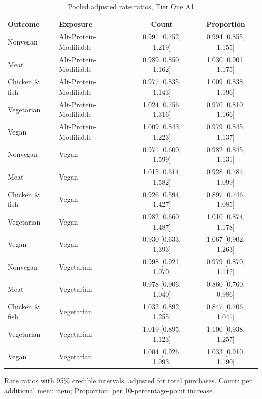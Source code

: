 

\begin{table}[H]
\centering
\caption{Pooled adjusted rate ratios, Tier One A1}
\label{tab:rr_t1_a1}
\begin{tabular}{llcc}
\toprule
Outcome & Exposure & Count & Proportion \\
\midrule
Nonvegan & Alt-Protein-Modifiable & 0.991 [0.752, 1.219] & 0.994 [0.855, 1.155] \\
Meat & Alt-Protein-Modifiable & 0.989 [0.850, 1.162] & 1.030 [0.901, 1.175] \\
Chicken \& fish & Alt-Protein-Modifiable & 0.977 [0.835, 1.143] & 1.009 [0.838, 1.196] \\
Vegetarian & Alt-Protein-Modifiable & 1.024 [0.756, 1.316] & 0.970 [0.810, 1.166] \\
Vegan & Alt-Protein-Modifiable & 1.009 [0.843, 1.223] & 0.979 [0.845, 1.137] \\
Nonvegan & Vegan & 0.971 [0.600, 1.599] & 0.982 [0.845, 1.131] \\
Meat & Vegan & 1.015 [0.614, 1.582] & 0.928 [0.787, 1.099] \\
Chicken \& fish & Vegan & 0.926 [0.594, 1.427] & 0.897 [0.746, 1.085] \\
Vegetarian & Vegan & 0.982 [0.660, 1.487] & 1.010 [0.874, 1.178] \\
Vegan & Vegan & 0.930 [0.633, 1.393] & 1.067 [0.902, 1.263] \\
Nonvegan & Vegetarian & 0.998 [0.921, 1.070] & 0.979 [0.870, 1.112] \\
Meat & Vegetarian & 0.978 [0.906, 1.040] & 0.860 [0.760, 0.986] \\
Chicken \& fish & Vegetarian & 1.032 [0.892, 1.255] & 0.847 [0.706, 1.041] \\
Vegetarian & Vegetarian & 1.019 [0.895, 1.123] & 1.100 [0.938, 1.257] \\
Vegan & Vegetarian & 1.004 [0.926, 1.093] & 1.033 [0.910, 1.190] \\
\bottomrule
\end{tabular}
\par\smallskip\footnotesize Rate ratios with 95\% credible intervals, adjusted for total purchases. Count: per additional menu item; Proportion: per 10-percentage-point increase.
\end{table}


